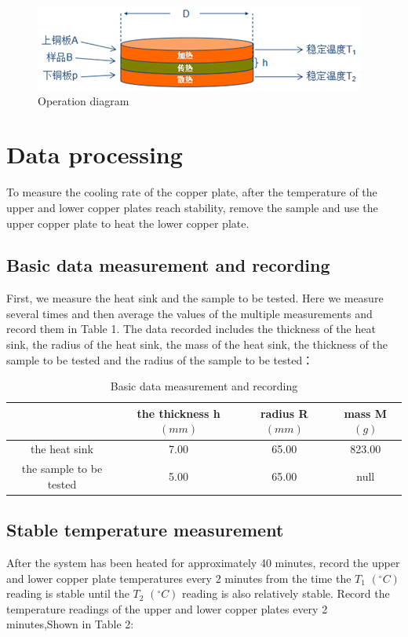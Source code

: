 \documentclass[UTF8]{article}
\begin{document}
     \begin{figure}[H]
     	\centering
     	\includegraphics[clip,scale=1.1]{fig/fig11.png}
     	\caption{Operation diagram}
     	\label{figure.10}
     \end{figure}
    
	
	\section{Data processing}
	To measure the cooling rate of the copper plate, after the temperature of the upper and lower copper plates reach stability, remove the sample and use the upper copper plate to heat the lower copper plate.
	\subsection{Basic data measurement and recording}
    First, we measure the heat sink and the sample to be tested. Here we measure several times and then average the values of the multiple measurements and record them in Table 1. The data recorded includes the thickness of the heat sink, the radius of the heat sink, the mass of the heat sink, the thickness of the sample to be tested and the radius of the sample to be tested：
    	\begin{table}[H]
    		\centering
    	\begin{tabular}{cccc}
    		\toprule
    		 & the thickness h$\left (mm \right ) $ & radius R$\left ( mm  \right ) $&mass M$\left (g \right ) $\\
    		\midrule
    		the heat sink & 7.00 & 65.00 & 823.00 \\
    		the sample to be tested & 5.00 & 65.00 & null \\
    		\bottomrule
    	\end{tabular}
    \caption{Basic data measurement and recording}
    \label{table.1}
    \end{table}

    \subsection{Stable temperature measurement}
    After the system has been heated for approximately 40 minutes, record the upper and lower copper plate temperatures every 2 minutes from the time the $T_{1}$ $\left ( ^{\circ} C \right ) $ reading is stable until the $T_{2}$ $\left ( ^{\circ} C \right ) $ reading is also relatively stable. Record the temperature readings of the upper and lower copper plates every 2 minutes,Shown in Table 2:
    
\end{document}
